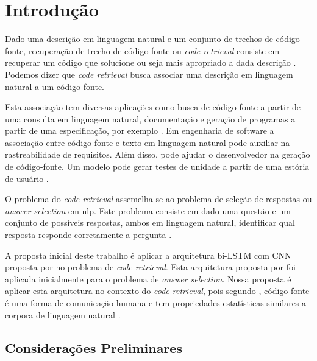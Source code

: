 \chapter{Introdução}
\label{cap:introducao}

Dado uma descrição em linguagem natural e um conjunto de trechos de código-fonte, recuperação de trecho de código-fonte ou \textit{code retrieval} consiste em recuperar um código que solucione ou seja mais apropriado a dada descrição \citep{Allamanis-bimodal-source-code-natural-language:2015}. Podemos dizer que \textit{code retrieval} busca associar uma descrição em linguagem natural a um código-fonte. 

Esta associação tem diversas aplicações como busca de código-fonte a partir de uma consulta em linguagem natural, documentação e geração de programas a partir de uma especificação, por exemplo \citep{Allamanis:2018:SML}. Em engenharia de software a associação entre código-fonte e texto em linguagem natural pode auxiliar na rastreabilidade de requisitos. Além disso, pode ajudar o desenvolvedor na geração de código-fonte. Um modelo pode gerar testes de unidade a partir de uma estória de usuário .

O problema do \textit{code retrieval} assemelha-se ao problema de seleção de respostas ou \textit{answer selection} em \acrshort{nlp}. Este problema consiste em dado uma questão e um conjunto de possíveis respostas, ambos em linguagem natural, identificar qual resposta responde corretamente a pergunta \citep{lai-etal-2018-review}. 

A proposta inicial deste trabalho é aplicar a arquitetura bi-LSTM com CNN proposta por \cite{tan-lstm-qa} no problema de \textit{code retrieval}. Esta arquitetura proposta por \cite{tan-lstm-qa} foi aplicada inicialmente para o problema de \textit{answer selection}. Nossa proposta é aplicar esta arquitetura no contexto do \textit{code retrieval}, pois segundo \cite{Allamanis:2018:SML}, código-fonte é uma forma de comunicação humana e tem propriedades estatísticas similares a corpora de linguagem natural .




\section{Considerações Preliminares}
\label{sec:consideracoes_preliminares}

